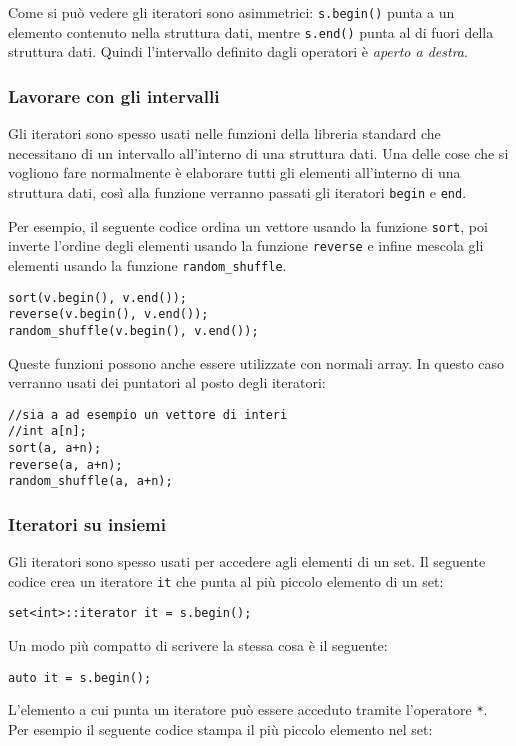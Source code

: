 Come si può vedere gli iteratori sono asimmetrici:
\texttt{s.begin()} punta a un elemento contenuto nella struttura dati,
mentre \texttt{s.end()} punta al di fuori della struttura dati.
Quindi l'intervallo definito dagli operatori è \emph{aperto a destra}.

\subsubsection{Lavorare con gli intervalli}

Gli iteratori sono spesso usati nelle funzioni della libreria
standard che necessitano di un intervallo all'interno di una struttura dati.
Una delle cose che si vogliono fare normalmente è elaborare
tutti gli elementi all'interno di una struttura dati,
così alla funzione verranno passati gli iteratori
\texttt{begin} e \texttt{end}.

Per esempio, il seguente codice ordina un vettore
usando la funzione \texttt{sort},
poi inverte l'ordine degli elementi usando la funzione
\texttt{reverse} e infine mescola gli elementi usando la funzione
\texttt{random\_shuffle}.


\begin{lstlisting}
sort(v.begin(), v.end());
reverse(v.begin(), v.end());
random_shuffle(v.begin(), v.end());
\end{lstlisting}

Queste funzioni possono anche essere utilizzate con normali array.
In questo caso verranno usati dei puntatori al posto degli iteratori:

\newpage
\begin{lstlisting}
//sia a ad esempio un vettore di interi
//int a[n];
sort(a, a+n);
reverse(a, a+n);
random_shuffle(a, a+n);
\end{lstlisting}

\subsubsection{Iteratori su insiemi}

Gli iteratori sono spesso usati per accedere 
agli elementi di un set.
Il seguente codice crea un iteratore
\texttt{it} che punta al più piccolo elemento di un set:
\begin{lstlisting}
set<int>::iterator it = s.begin();
\end{lstlisting}
Un modo più compatto di scrivere la stessa cosa è il seguente:
\begin{lstlisting}
auto it = s.begin();
\end{lstlisting}
L'elemento a cui punta un iteratore può essere acceduto
tramite l'operatore \texttt{*}.
Per esempio il seguente codice
stampa il più piccolo elemento nel set:

